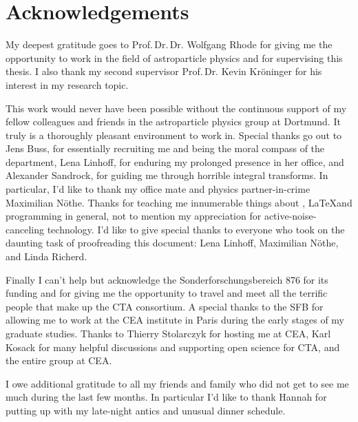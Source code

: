 
\chapter*{Acknowledgements}

My deepest gratitude goes to Prof.\,Dr.\,Dr. Wolfgang Rhode for giving me the opportunity to 
work in the field of astroparticle physics and for supervising this thesis.
I also thank my second supervisor Prof.\,Dr. Kevin Kröninger for his interest in my research topic.

This work would never have been possible without the continuous support of my fellow colleagues and friends in the 
astroparticle physics group at Dortmund. It truly is a thoroughly pleasant environment to work in. 
Special thanks go out to Jens Buss, for essentially recruiting me and being the moral compass of the department, 
Lena Linhoff, for enduring my prolonged presence in her office, and Alexander Sandrock, for guiding me through horrible integral transforms.
In particular, I'd like to thank my office mate and physics partner-in-crime Maximilian Nöthe. Thanks for teaching 
me innumerable things about \python, \LaTeX and programming in general, not to mention my appreciation for active-noise-canceling technology. 
I'd like to give special thanks to everyone who took on the daunting task of 
proofreading this document: Lena Linhoff, Maximilian Nöthe, and Linda Richerd. 

Finally I can't help but acknowledge the Sonderforschungsbereich 876 for its funding 
and for giving me the opportunity to travel and meet all the terrific people that make up the CTA consortium.
A special thanks to the SFB for allowing me to work at the CEA institute in Paris during the early stages of my graduate studies.
Thanks to Thierry Stolarczyk for hosting me at CEA, Karl Kosack 
for many helpful discussions and supporting open science for CTA, and the entire group at CEA. 

I owe additional gratitude to all my friends and family who did not get to see me much during the last few months. 
In particular I'd like to thank Hannah for putting up with my late-night antics and unusual dinner schedule.
